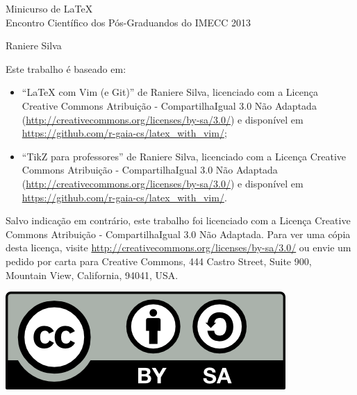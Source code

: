 \pagestyle{empty}
\begin{center}
  \huge{Minicurso de \LaTeX \\ Encontro Científico dos Pós-Graduandos do IMECC
  2013}

  \vspace{1cm}
  \Large{Raniere Silva}
\end{center}
\vfill
Este trabalho é baseado em:
\begin{itemize} 
  \item ``LaTeX com Vim (e Git)'' de Raniere Silva, licenciado
    com a Licença Creative Commons Atribuição -
    CompartilhaIgual 3.0 Não Adaptada
    (\url{http://creativecommons.org/licenses/by-sa/3.0/}) e
    disponível em \url{https://github.com/r-gaia-cs/latex_with_vim/};
  \item ``TikZ para professores'' de Raniere Silva, licenciado com a
    Licença Creative Commons Atribuição - CompartilhaIgual 3.0
    Não Adaptada
    (\url{http://creativecommons.org/licenses/by-sa/3.0/}) e
    disponível em \url{https://github.com/r-gaia-cs/latex_with_vim/}.
\end{itemize}

Salvo indicação em contrário, este trabalho foi licenciado com a
Licença Creative Commons Atribuição - CompartilhaIgual 3.0
Não Adaptada. Para ver uma cópia desta licença, visite
\url{http://creativecommons.org/licenses/by-sa/3.0/} ou envie um pedido por
carta para Creative Commons, 444 Castro Street, Suite 900, Mountain View,
California, 94041, USA.

\begin{center}
  \includegraphics[keepaspectratio=true]{../../figures/cc-by-sa.png}
\end{center}
